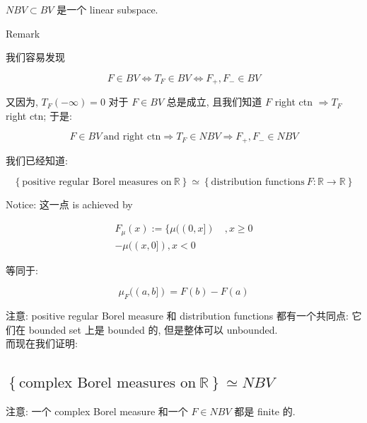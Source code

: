 \documentclass{qlnotes-export}
\begin{document}
\begin{proposition}

\(NBV \subset BV\) 是一个 linear subspace.

\end{proposition}

\begin{qlremark}{Remark}

我们容易发现

\[F \in BV\Leftrightarrow T_{F} \in BV\Leftrightarrow F_{+},F_{-} \in BV\]

又因为, \(T_{F}( - \infty) = 0\) 对于 \(F \in BV\) 总是成立, 且我们知道 \(F\) right ctn \(\Longrightarrow T_{F}\) right ctn; 于是:

\[F \in BV\ \text{and right ctn}\Longrightarrow T_{F} \in NBV\Longrightarrow F_{+},F_{-} \in NBV\]

\end{qlremark}

我们已经知道:

\[\left\{ {\text{positive regular Borel measures on}\ {\mathbb{R}}} \right\} \simeq \left\{ {\text{distribution functions}\ F:{\mathbb{R}}\rightarrow{\mathbb{R}}} \right\}\]

Notice: 这一点 is achieved by

\[\begin{matrix}
{F_{\mu}(x) := \{\mu((0,x\rbrack)\quad,x \geq 0} \\
{- \mu((x,0\rbrack),x < 0}
\end{matrix}\]

等同于:

\[\mu_{F}((a,b\rbrack) = F(b) - F(a)\]

注意: positive regular Borel measure 和 distribution functions 都有一个共同点: 它们在 bounded set 上是 bounded 的, 但是整体可以 unbounded.\\
而现在我们证明:

\subsection{\texorpdfstring{\(\left\{ {\text{complex Borel measures on}\ {\mathbb{R}}} \right\} \simeq NBV\)}{\textbackslash left\textbackslash\{ \{\textbackslash text\{complex Borel measures on\}\textbackslash{} \{\textbackslash mathbb\{R\}\}\} \textbackslash right\textbackslash\} \textbackslash simeq NBV}}\label{left-textcomplex-borel-measures-on-mathbbr-right-simeq-nbv}

注意: 一个 complex Borel measure 和一个 \(F \in NBV\) 都是 finite 的.
\end{document}
